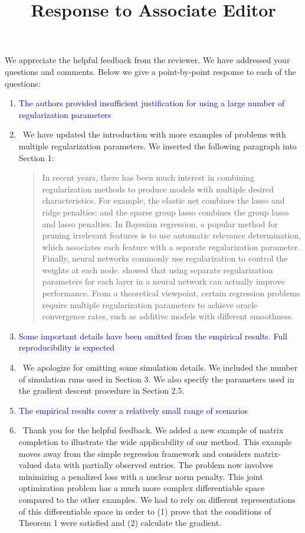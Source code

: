 \documentclass[]{article}
\title{Response to Associate Editor}
\newcommand{\point}[1]{\item \textcolor{blue}{#1}}
\newcommand{\reply}{\item[]\ }
\begin{document}
	\maketitle
		
	We appreciate the helpful feedback from the reviewer. We have addressed your questions and comments. Below we give a point-by-point response to each of the questions:
		
	\begin{enumerate}
		\point{The authors provided insufficient justification for using a large number of regularization parameters}

		\reply  We have updated the introduction with more examples of problems with multiple regularization parameters. We inserted the following paragraph into Section 1:
		
		\begin{quote}
			In recent years, there has been much interest in combining regularization methods to produce models with multiple desired characteristics. For example, the elastic net combines the lasso and ridge penalties; and the sparse group lasso  combines the group lasso and lasso penalties. In Bayesian regression, a popular method for pruning irrelevant features is to use automatic relevance determination, which associates each feature with a separate regularization parameter. Finally, neural networks commonly use regularization to control the weights at each node.  showed that using separate regularization parameters for each layer in a neural network can actually improve performance. From a theoretical viewpoint, certain regression problems require multiple regularization parameters to achieve oracle convergence rates, such as additive models with different smoothness.
		\end{quote}
		
		\point{Some important details have been omitted from the empirical results. Full reproducibility is expected}
		
		\reply We apologize for omitting some simulation details. We included the number of simulation runs used in Section 3. We also specify the parameters used in the gradient descent procedure in Section 2.5.
		
		\point{The empirical results cover a relatively small range of scenarios}
		
		\reply Thank you for the helpful feedback. We added a new example of matrix completion to illustrate the wide applicability of our method. This example moves away from the simple regression framework and considers matrix-valued data with partially observed entries. The problem now involves minimizing a penalized loss with a nuclear norm penalty. This joint optimization problem has a much more complex differentiable space compared to the other examples. We had to rely on different representations of this differentiable space in order to (1) prove that the conditions of Theorem 1 were satisfied and (2) calculate the gradient.
		

\end{enumerate}
\end{document}
